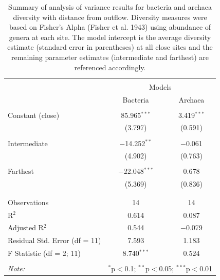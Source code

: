 \documentclass[letterpaper,12pt]{article}\usepackage[]{graphicx}\usepackage[]{color}
\begin{document}
\begin{table}[!htbp] \centering 
  \caption{Summary of analysis of variance results for bacteria and archaea diversity with distance from outflow.  Diversity measures were based on Fisher's Alpha (Fisher et al. 1943) using abundance of genera at each site. The model intercept is the average diversity estimate (standard error in parentheses) at all close sites and the remaining parameter estimates (intermediate and farthest) are referenced accordingly.} 
  \label{} 
\begin{tabular}{@{\extracolsep{5pt}}lcc} 
\\[-1.8ex]\hline 
\hline \\[-1.8ex] 
 & \multicolumn{2}{c}{Models} \\ 
\cline{2-3} 
 & Bacteria & Archaea \\ 
\hline \\[-1.8ex] 
 Constant (close) & 85.965$^{***}$ & 3.419$^{***}$ \\ 
  & (3.797) & (0.591) \\ 
  & & \\ 
 Intermediate & $-$14.252$^{**}$ & $-$0.061 \\ 
  & (4.902) & (0.763) \\ 
  & & \\ 
 Farthest & $-$22.048$^{***}$ & 0.678 \\ 
  & (5.369) & (0.836) \\ 
  & & \\ 
\hline \\[-1.8ex] 
Observations & 14 & 14 \\ 
R$^{2}$ & 0.614 & 0.087 \\ 
Adjusted R$^{2}$ & 0.544 & $-$0.079 \\ 
Residual Std. Error (df = 11) & 7.593 & 1.183 \\ 
F Statistic (df = 2; 11) & 8.740$^{***}$ & 0.524 \\ 
\hline 
\hline \\[-1.8ex] 
\textit{Note:}  & \multicolumn{2}{r}{$^{*}$p$<$0.1; $^{**}$p$<$0.05; $^{***}$p$<$0.01} \\ 
\end{tabular} 
\end{table} 
\end{document}
